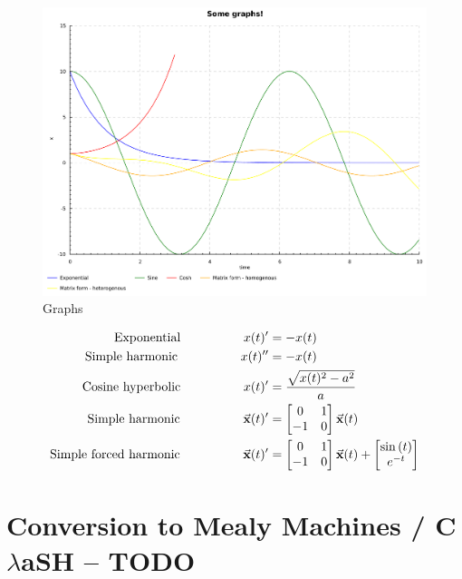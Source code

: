 \begin{figure}[h!]
	\centering
	\includegraphics[width=\textwidth]{../haskell/output.pdf}
	\caption{Graphs}
	\label{fig:solver_example}
\end{figure}

\begin{align}
\text{Exponential}\hspace{50pt}{}			x(t)' &= -x(t)  \\
\text{Simple harmonic}\hspace{50pt}{}		x(t)'' &= -x(t) \\
\text{Cosine hyperbolic}\hspace{50pt}{}		x(t)' &= \frac{\sqrt{x(t)^{2} - a^{2}}}{a} \\
\text{Simple harmonic}\hspace{50pt}{}		\vec{\mathbf{x}}(t)' &= \begin{bmatrix} 0 & 1 \\ -1 & 0 \\ \end{bmatrix}\vec{\mathbf{x}}(t) \\
\text{Simple forced harmonic}\hspace{50pt}{}	\vec{\mathbf{x}}(t)' &= \begin{bmatrix} 0 & 1 \\ -1 & 0 \\ \end{bmatrix}\vec{\mathbf{x}}(t) + \begin{bmatrix} \sin{(t)} \\ e^{-t} \\ \end{bmatrix}
\end{align}




\section{Conversion to Mealy Machines / C$\lambda$aSH -- TODO}

